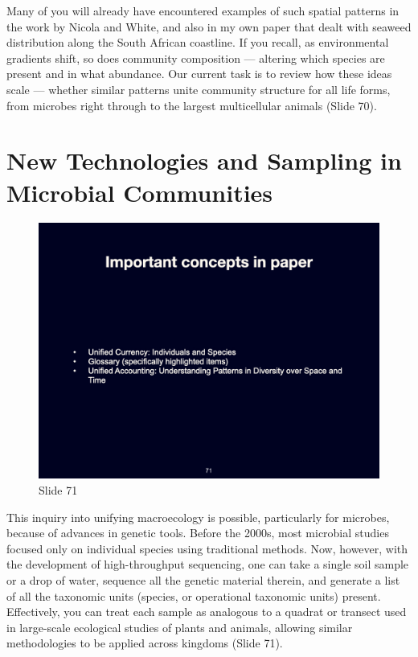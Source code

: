\documentclass[
  11pt,
]{book}
\begin{document}
Many of you will already have encountered examples of such spatial
patterns in the work by Nicola and White, and also in my own paper that
dealt with seaweed distribution along the South African coastline. If
you recall, as environmental gradients shift, so does community
composition --- altering which species are present and in what
abundance. Our current task is to review how these ideas scale ---
whether similar patterns unite community structure for all life forms,
from microbes right through to the largest multicellular animals (Slide
70).

\section{New Technologies and Sampling in Microbial
Communities}\label{new-technologies-and-sampling-in-microbial-communities}

\begin{figure}[ht]
\centering
\includegraphics[width=0.8\linewidth]{../images/BDC334/BDC334-071.jpeg}
\caption*{Slide 71}
\end{figure}

This inquiry into unifying macroecology is possible, particularly for
microbes, because of advances in genetic tools. Before the 2000s, most
microbial studies focused only on individual species using traditional
methods. Now, however, with the development of high-throughput
sequencing, one can take a single soil sample or a drop of water,
sequence all the genetic material therein, and generate a list of all
the taxonomic units (species, or operational taxonomic units) present.
Effectively, you can treat each sample as analogous to a quadrat or
transect used in large-scale ecological studies of plants and animals,
allowing similar methodologies to be applied across kingdoms (Slide 71).
\end{document}
